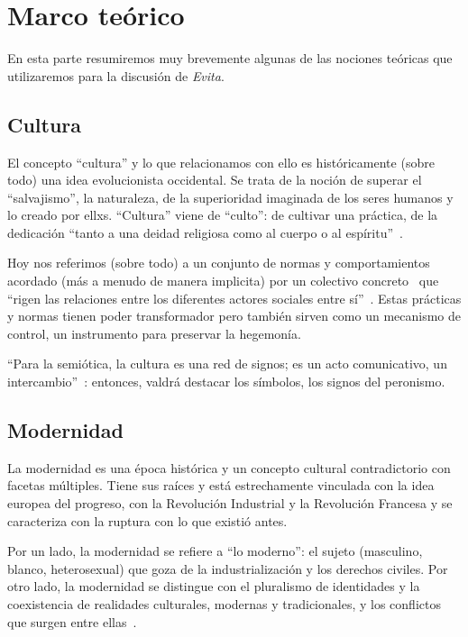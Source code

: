 \documentclass[
10pt, %
a4paper, %
oneside, %
headinclude,footinclude, %
]{scrartcl}
\begin{document}
\section{Marco teórico}

En esta parte resumiremos muy brevemente algunas de las nociones teóricas que utilizaremos para la discusión de \textit{Evita}.

\subsection{Cultura}

El concepto ``cultura'' y lo que relacionamos con ello es históricamente (sobre todo) una idea evolucionista occidental.
Se trata de la noción de superar el ``salvajismo'', la naturaleza, de la superioridad imaginada de los seres humanos y lo creado por ellxs.
``Cultura'' viene de ``culto'': de cultivar una práctica, de la dedicación ``tanto a una deidad religiosa como al cuerpo o al espíritu''~\autocite[p.71]{SzIr2009}.

Hoy nos referimos (sobre todo) a un conjunto de normas y comportamientos acordado (más a menudo de manera implicita) por un colectivo concreto~\autocite[p.52]{GKS2016} que ``rigen las relaciones entre los diferentes actores sociales entre sí''~\autocite[p.48]{SzIr2009}.
Estas prácticas y normas tienen poder transformador pero también sirven como un mecanismo de control, un instrumento para preservar la hegemonía.

``Para la semiótica, la cultura es una red de signos; es un acto comunicativo, un intercambio''~\autocite[p.71]{SzIr2009}:
entonces, valdrá destacar los símbolos, los signos del peronismo.

\subsection{Modernidad}

La modernidad es una época histórica y un concepto cultural contradictorio con facetas múltiples.
Tiene sus raíces y está estrechamente vinculada con la idea europea del progreso, con la Revolución Industrial y la Revolución Francesa y se caracteriza con la ruptura con lo que existió antes.

Por un lado, la modernidad se refiere a ``lo moderno'': el sujeto (masculino, blanco, heterosexual) que goza de la industrialización y los derechos civiles.
Por otro lado, la modernidad se distingue con el pluralismo de identidades y la coexistencia de realidades culturales, modernas y tradicionales, y los conflictos que surgen entre ellas~\autocite[p.177]{SzIr2009}.
\end{document}
